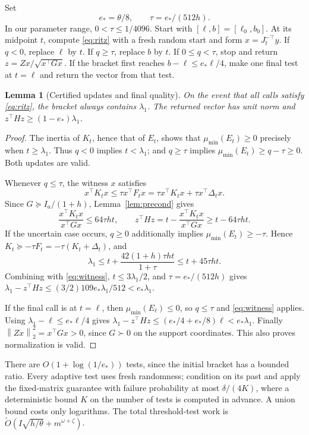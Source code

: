 \documentclass[11pt]{article}
\newtheorem{lemma}[theorem]{Lemma}
\newcommand{\norm}[1]{\left\lVert#1\right\rVert}
\newcommand{\tO}{\widetilde O}
\begin{document}
Set
\[
 e_* =\theta/8,\qquad \tau=e_*/(512h).
\]
In our parameter range, \(0<\tau\leq1/4096\).
Start with \([\ell,b]=[\ell_0,b_0]\). At its midpoint \(t\), compute
\eqref{eq:ritz} with a fresh random start and form
\(x=J_t^{-\top}y\). If \(q<0\), replace \(\ell\) by \(t\).
If \(q\geq\tau\), replace \(b\) by \(t\). If
\(0\leq q<\tau\), stop and return
\(z=Zx/\sqrt{x^\top Gx}\).
If the bracket first reaches \(b-\ell\leq e_*\ell/4\), make one final
test at \(t=\ell\) and return the vector from that test.

\begin{lemma}[Certified updates and final quality]\label{lem:rayleigh}
On the event that all calls satisfy \eqref{eq:ritz}, the bracket always
contains \(\lambda_1\). The returned vector has unit norm and
\(z^\top Hz\geq(1-e_*)\lambda_1\).
\end{lemma}
\begin{proof}
The inertia of \(K_t\), hence that of \(E_t\), shows that
\(\mu_{\min}(E_t)\geq0\) precisely when \(t\geq\lambda_1\).
Thus \(q<0\) implies \(t<\lambda_1\); and \(q\geq\tau\) implies
\(\mu_{\min}(E_t)\geq q-\tau\geq0\). Both updates are valid.

Whenever \(q\leq\tau\), the witness \(x\) satisfies
\[
 x^\top K_tx\leq\tau x^\top F_tx
   =\tau x^\top K_tx+\tau x^\top\Delta_tx.
\]
Since \(G\succeq I_a/(1+h)\), Lemma~\ref{lem:precond} gives
\begin{equation}\label{eq:witness}
 \frac{x^\top K_tx}{x^\top Gx}\leq64\tau ht,
 \qquad z^\top Hz=t-\frac{x^\top K_tx}{x^\top Gx}
                  \geq t-64\tau ht.
\end{equation}
If the uncertain case occurs, \(q\geq0\) additionally implies
\(\mu_{\min}(E_t)\geq-\tau\). Hence
\(K_t\succeq-\tau F_t=-\tau(K_t+\Delta_t)\), and
\[
 \lambda_1\leq t+
     \frac{42(1+h)\tau ht}{1+\tau}\leq t+45\tau ht.
\]
Combining with \eqref{eq:witness}, \(t\leq3\lambda_1/2\), and
\(\tau=e_*/(512h)\) gives
\(\lambda_1-z^\top Hz\leq(3/2)109 e_*\lambda_1/512<e_*\lambda_1\).

If the final call is at \(t=\ell\), then
\(\mu_{\min}(E_\ell)\leq0\), so \(q\leq\tau\) and
\eqref{eq:witness} applies. Using
\(\lambda_1-\ell\leq e_*\ell/4\) gives
\(\lambda_1-z^\top Hz\leq(e_*/4+e_*/8)\ell<e_*\lambda_1\).
Finally \(\norm{Zx}_2^2=x^\top Gx>0\), since \(G\succ0\) on the
support coordinates. This also proves normalization is valid.
\end{proof}

There are \(O(1+\log(1/e_*))\) tests, since the initial bracket has a
bounded ratio. Every adaptive test uses fresh randomness; condition on its
past and apply the fixed-matrix guarantee with failure probability at most
\(\delta/(4K)\), where a deterministic bound \(K\) on the number of
tests is computed in advance. A union bound costs only logarithms. The total
threshold-test work is \(\tO(I\sqrt{h/\theta}+m^{\omega+\zeta})\).
\end{document}
